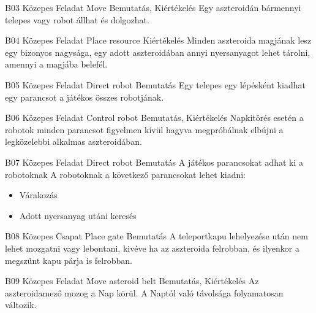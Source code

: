 \documentclass[../../projlab]{subfiles}
\begin{document}
\begin{funkovetelmeny}
	{B03}
	{Közepes}
	{Feladat}
	{Move}
	{Bemutatás, Kiértékelés}
	{Egy aszteroidán bármennyi telepes vagy robot állhat és dolgozhat.}
    
\end{funkovetelmeny}

\begin{funkovetelmeny}
	{B04}
	{Közepes}
	{Feladat}
	{Place resource}
	{Kiértékelés}
	{Minden aszteroida magjának lesz egy bizonyos nagysága, egy adott aszteroidában annyi nyersanyagot lehet tárolni, amennyi a magjába belefél.}
    
\end{funkovetelmeny}

\begin{funkovetelmeny}
	{B05}
	{Közepes}
	{Feladat}
	{Direct robot}
	{Bemutatás}
	{Egy telepes egy lépésként kiadhat egy parancsot a játékos összes robotjának.}
    
\end{funkovetelmeny}

\begin{funkovetelmeny}
	{B06}
	{Közepes}
	{Feladat}
	{Control robot}
	{Bemutatás, Kiértékelés}
	{Napkitörés esetén a robotok minden parancsot figyelmen kívül hagyva megpróbálnak elbújni a legközelebbi alkalmas aszteroidában.}
    
\end{funkovetelmeny}

\begin{funkovetelmeny}
	{B07}
	{Közepes}
	{Feladat}
	{Direct robot}
	{Bemutatás}
	{A játékos parancsokat adhat ki a robotoknak}
    A robotoknak a következő parancsokat lehet kiadni: \newline
	\begin{itemize}
		\item Várakozás
		\item Adott nyersanyag utáni keresés
	\end{itemize}
\end{funkovetelmeny}

\begin{funkovetelmeny}
	{B08}
	{Közepes}
	{Csapat}
	{Place gate}
	{Bemutatás}
	{A teleportkapu lehelyezése után nem lehet mozgatni vagy lebontani, kivéve ha az aszteroida felrobban, és ilyenkor a megszűnt kapu párja is felrobban.}
    
\end{funkovetelmeny}

\begin{funkovetelmeny}
	{B09}
	{Közepes}
	{Feladat}
	{Move asteroid belt}
	{Bemutatás, Kiértékelés}
	{Az aszteroidamező mozog a Nap körül. A Naptól való távolsága folyamatosan változik.}
    
\end{funkovetelmeny}
\end{document}
